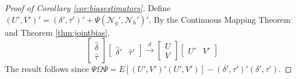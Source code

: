 \begin{proof}[Proof of Corollary \ref{cor:biasestimators}]
  Define $(U', V')' = (\delta', \tau')' + \Psi (\mathscr{N}_g', \mathscr{N}_h')'$. 
By the Continuous Mapping Theorem and Theorem \ref{thm:jointbias},
	$$\left[\begin{array}{c} \widehat{\delta} \\ \widehat{\tau} \end{array}\right]\left[\begin{array}{cc} \widehat{\delta}' & \widehat{\tau}'\end{array} \right] \overset{d}{\rightarrow} \left[\begin{array}{c} U\\V \end{array}\right]\left[\begin{array}{cc}U' & V'\end{array} \right] $$
  The result follows since $\Psi\Omega\Psi = E [(U', V')' (U', V')] - (\delta', \tau')' (\delta', \tau')$.
\end{proof}

